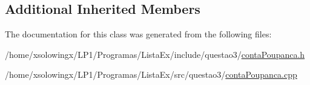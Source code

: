 \subsection*{Additional Inherited Members}


The documentation for this class was generated from the following files\+:\begin{DoxyCompactItemize}
\item 
/home/xsolowingx/\+L\+P1/\+Programas/\+Lista\+Ex/include/questao3/\hyperlink{contaPoupanca_8h}{conta\+Poupanca.\+h}\item 
/home/xsolowingx/\+L\+P1/\+Programas/\+Lista\+Ex/src/questao3/\hyperlink{contaPoupanca_8cpp}{conta\+Poupanca.\+cpp}\end{DoxyCompactItemize}
